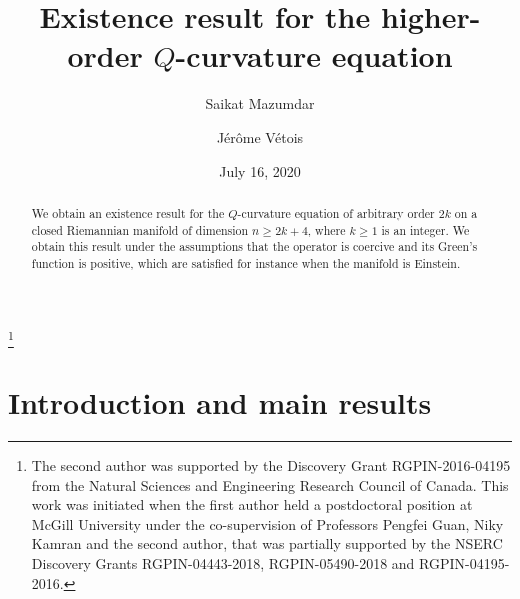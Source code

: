 \documentclass[reqno]{amsart}
\numberwithin{equation}{section}
\newcommand{\<}{\left<}
\renewcommand{\>}{\right>}
\renewcommand{\[}{\left[}
\renewcommand{\]}{\right]}
\renewcommand{\(}{\left(}
\renewcommand{\)}{\right)}
\begin{document}
\title[Higher-order $Q$-curvature equation]{Existence result for the higher-order $Q$-curvature equation}

\author{Saikat Mazumdar}

\address{Saikat Mazumdar, Department of Mathematics, Indian Institute of Technology Bombay, Mumbai 400076, India}


\author{J\'er\^ome V\'etois}

\address{J\'er\^ome V\'etois, Department of Mathematics and Statistics, McGill University, 805 Sherbrooke Street West, Montreal, Quebec H3A 0B9, Canada}

\thanks{The second author was supported by the Discovery Grant RGPIN-2016-04195 from the Natural
Sciences and Engineering Research Council of Canada. This work was initiated when the first author held a postdoctoral position at McGill University under the co-supervision of Professors Pengfei Guan, Niky Kamran and the second author, that was partially supported by the NSERC Discovery Grants RGPIN-04443-2018, RGPIN-05490-2018 and RGPIN-04195-2016.}

\date{July 16, 2020}

\begin{abstract}
We obtain an existence result for the $Q$-curvature equation of arbitrary order $2k$ on a closed Riemannian manifold of dimension $n\ge 2k+4$, where $k\ge1$ is an integer. We obtain this result under the assumptions that the operator is coercive and its Green's function is positive, which are satisfied for instance when the manifold is Einstein.
\end{abstract}

\maketitle

\section{Introduction and main results}\label{Sec1}
\end{document}
